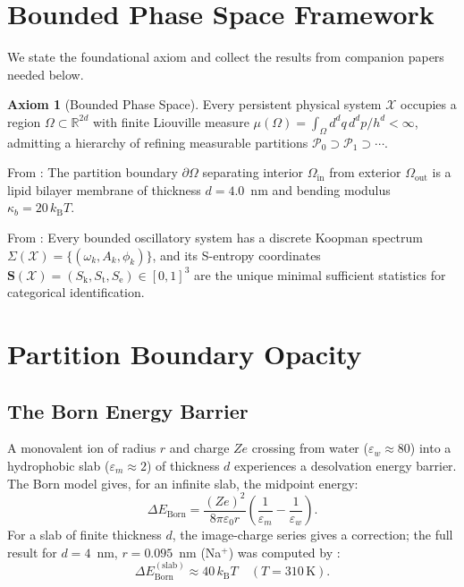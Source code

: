 \documentclass[11pt,twocolumn,a4paper]{article}
\theoremstyle{definition}
\newtheorem{axiom}{Axiom}
\theoremstyle{remark}
\newcommand{\kB}{k_{\mathrm{B}}}
\newcommand{\Sk}{S_{\mathrm{k}}}
\newcommand{\St}{S_{\mathrm{t}}}
\newcommand{\Se}{S_{\mathrm{e}}}
\newcommand{\kap}{\kappa}
\newcommand{\Sent}{\bm{S}}
\begin{document}
\section{Bounded Phase Space Framework}
\label{sec:bps}

We state the foundational axiom and collect the results from companion papers
\citep{companion1, companion2} needed below.

\begin{axiom}[Bounded Phase Space]
\label{ax:bps}
Every persistent physical system $\mathcal{X}$ occupies a region
$\Omega \subset \mathbb{R}^{2d}$ with finite Liouville measure
$\mu(\Omega) = \int_\Omega d^d q\, d^d p / h^d < \infty$,
admitting a hierarchy of refining measurable partitions
$\mathscr{P}_0 \supset \mathscr{P}_1 \supset \cdots$.
\end{axiom}

\noindent From \citep{companion1}: The partition boundary $\partial\Omega$
separating interior $\Omega_{\mathrm{in}}$ from exterior $\Omega_{\mathrm{out}}$
is a lipid bilayer membrane of thickness $d = 4.0$~nm and bending modulus
$\kap_b = 20\,\kB T$.

\noindent From \citep{companion2}: Every bounded oscillatory system has a
discrete Koopman spectrum $\Sigma(\mathcal{X}) = \{(\omega_k, A_k, \phi_k)\}$,
and its S-entropy coordinates $\Sent(\mathcal{X}) = (\Sk, \St, \Se) \in [0,1]^3$
are the unique minimal sufficient statistics for categorical identification.

\section{Partition Boundary Opacity}
\label{sec:opacity}

\subsection{The Born Energy Barrier}

A monovalent ion of radius $r$ and charge $Ze$ crossing from water
($\varepsilon_w \approx 80$) into a hydrophobic slab ($\varepsilon_m \approx 2$)
of thickness $d$ experiences a desolvation energy barrier. The Born
model \citep{born1920} gives, for an infinite slab, the midpoint energy:
\begin{equation}
\Delta E_{\mathrm{Born}} = \frac{(Ze)^2}{8\pi\varepsilon_0 r}
\left(\frac{1}{\varepsilon_m} - \frac{1}{\varepsilon_w}\right).
\label{eq:born}
\end{equation}
For a slab of finite thickness $d$, the image-charge series
gives a correction; the full result for $d = 4$~nm,
$r = 0.095$~nm (Na$^+$) was computed by \citet{parsegian1969}:
\begin{equation}
\Delta E_{\mathrm{Born}}^{(\mathrm{slab})} \approx 40\,\kB T \quad
(T = 310\,\mathrm{K}).
\label{eq:born_slab}
\end{equation}
\end{document}
